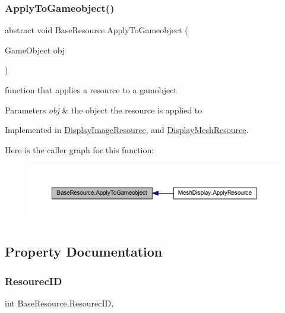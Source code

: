 \subsubsection{\texorpdfstring{Apply\+To\+Gameobject()}{ApplyToGameobject()}}
{\footnotesize\ttfamily abstract void Base\+Resource.\+Apply\+To\+Gameobject (\begin{DoxyParamCaption}\item[{Game\+Object}]{obj }\end{DoxyParamCaption})\hspace{0.3cm}{\ttfamily [pure virtual]}}



function that applies a resource to a gamobject 


\begin{DoxyParams}{Parameters}
{\em obj} & the object the resource is applied to\\
\hline
\end{DoxyParams}


Implemented in \mbox{\hyperlink{class_display_image_resource_a26992a5ecb6c449d85539cc5d07112e2}{Display\+Image\+Resource}}, and \mbox{\hyperlink{class_display_mesh_resource_a62672f28a402bebeed1cb79fcca81828}{Display\+Mesh\+Resource}}.

Here is the caller graph for this function\+:
\nopagebreak
\begin{figure}[H]
\begin{center}
\leavevmode
\includegraphics[width=350pt]{class_base_resource_a2d832c8042114da9e3f6240651d59703_icgraph}
\end{center}
\end{figure}


\subsection{Property Documentation}
\mbox{\label{class_base_resource_adbdcd8935067e622c993b912a475c21b}} 
\subsubsection{\texorpdfstring{Resourec\+ID}{ResourecID}}
{\footnotesize\ttfamily int Base\+Resource.\+Resourec\+ID\hspace{0.3cm}{\ttfamily [get]}, {\ttfamily [set]}}



